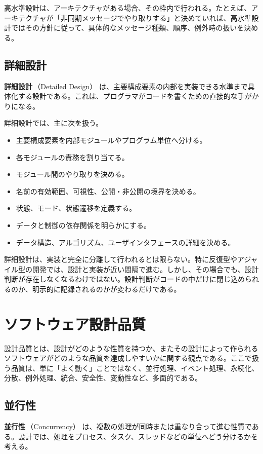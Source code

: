 \documentclass[10.5pt,a4paper]{ltjsarticle}
\newcommand{\term}[2]{\textbf{#1}\,（#2）}
\begin{document}
高水準設計は、アーキテクチャがある場合、その枠内で行われる。たとえば、アーキテクチャが「非同期メッセージでやり取りする」と決めていれば、高水準設計ではその方針に従って、具体的なメッセージ種類、順序、例外時の扱いを決める。

\subsection{詳細設計}

\term{詳細設計}{Detailed Design} は、主要構成要素の内部を実装できる水準まで具体化する設計である。これは、プログラマがコードを書くための直接的な手がかりになる。

詳細設計では、主に次を扱う。
\begin{itemize}
  \item 主要構成要素を内部モジュールやプログラム単位へ分ける。
  \item 各モジュールの責務を割り当てる。
  \item モジュール間のやり取りを決める。
  \item 名前の有効範囲、可視性、公開・非公開の境界を決める。
  \item 状態、モード、状態遷移を定義する。
  \item データと制御の依存関係を明らかにする。
  \item データ構造、アルゴリズム、ユーザインタフェースの詳細を決める。
\end{itemize}

詳細設計は、実装と完全に分離して行われるとは限らない。特に反復型やアジャイル型の開発では、設計と実装が近い間隔で進む。しかし、その場合でも、設計判断が存在しなくなるわけではない。設計判断がコードの中だけに閉じ込められるのか、明示的に記録されるのかが変わるだけである。

\section{ソフトウェア設計品質}

設計品質とは、設計がどのような性質を持つか、またその設計によって作られるソフトウェアがどのような品質を達成しやすいかに関する観点である。ここで扱う品質は、単に「よく動く」ことではなく、並行処理、イベント処理、永続化、分散、例外処理、統合、安全性、変動性など、多面的である。

\subsection{並行性}

\term{並行性}{Concurrency} は、複数の処理が同時または重なり合って進む性質である。設計では、処理をプロセス、タスク、スレッドなどの単位へどう分けるかを考える。
\end{document}
